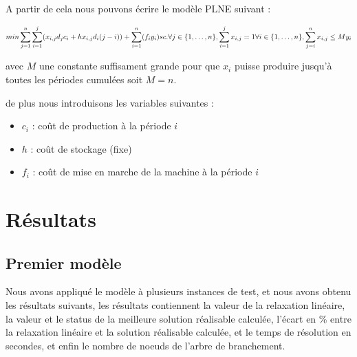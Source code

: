 \documentclass[10pt]{article}
\begin{document}
A partir de cela nous pouvons écrire le modèle PLNE suivant :

$$
  min \sum_{j=1}^{n}\sum_{i=1}^{j} (x_{i,j}d_jc_i + hx_{i,j}d_i(j-i)) + \sum_{i=1}^{n}(f_iy_i) \\ 
  sc. \space\space \forall{j}\in\{1,\dots,n\}, \sum_{i=1}^{j}x_{i,j} = 1\\
  \forall{i}\in\{1,\dots, n\} ,\sum_{j=i}^{n}x_{i,j} \le My_i\\
$$

avec $M$ une constante suffisament grande pour que $x_i$ puisse produire jusqu'à toutes les périodes cumulées soit $M = n$.

de plus nous introduisons les variables suivantes :

\begin{itemize}
  \item $c_{i}$ : coût de production à la période $i$
  \item $h$ : coût de stockage (fixe)
  \item $f_{i}$ : coût de mise en marche de la machine à la période $i$
\end{itemize}

\section*{Résultats}

\subsection*{Premier modèle}
Nous avons appliqué le modèle à plusieurs instances de test, et nous avons obtenu les résultats suivants, les résultats contiennent la valeur de la relaxation linéaire, la valeur et le status de la meilleure solution réalisable calculée, l'écart en \% entre la relaxation linéaire et la solution réalisable calculée, et le temps de résolution en secondes, et enfin le nombre de noeuds de l'arbre de branchement.
\end{document}
